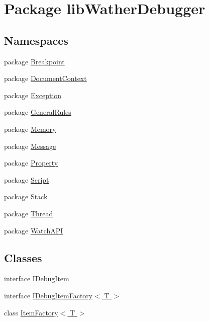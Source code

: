 \hypertarget{namespacelib_wather_debugger}{\section{Package lib\+Wather\+Debugger}
\label{namespacelib_wather_debugger}
}
\subsection*{Namespaces}
\begin{DoxyCompactItemize}
\item 
package \hyperlink{namespacelib_wather_debugger_1_1_breakpoint}{Breakpoint}
\item 
package \hyperlink{namespacelib_wather_debugger_1_1_document_context}{Document\+Context}
\item 
package \hyperlink{namespacelib_wather_debugger_1_1_exception}{Exception}
\item 
package \hyperlink{namespacelib_wather_debugger_1_1_general_rules}{General\+Rules}
\item 
package \hyperlink{namespacelib_wather_debugger_1_1_memory}{Memory}
\item 
package \hyperlink{namespacelib_wather_debugger_1_1_message}{Message}
\item 
package \hyperlink{namespacelib_wather_debugger_1_1_property}{Property}
\item 
package \hyperlink{namespacelib_wather_debugger_1_1_script}{Script}
\item 
package \hyperlink{namespacelib_wather_debugger_1_1_stack}{Stack}
\item 
package \hyperlink{namespacelib_wather_debugger_1_1_thread}{Thread}
\item 
package \hyperlink{namespacelib_wather_debugger_1_1_watch_a_p_i}{Watch\+A\+P\+I}
\end{DoxyCompactItemize}
\subsection*{Classes}
\begin{DoxyCompactItemize}
\item 
interface \hyperlink{interfacelib_wather_debugger_1_1_i_debug_item}{I\+Debug\+Item}
\item 
interface \hyperlink{interfacelib_wather_debugger_1_1_i_debug_item_factory_3_01_t_01_4}{I\+Debug\+Item\+Factory$<$ T $>$}
\item 
class \hyperlink{classlib_wather_debugger_1_1_item_factory_3_01_t_01_4}{Item\+Factory$<$ T $>$}
\end{DoxyCompactItemize}
